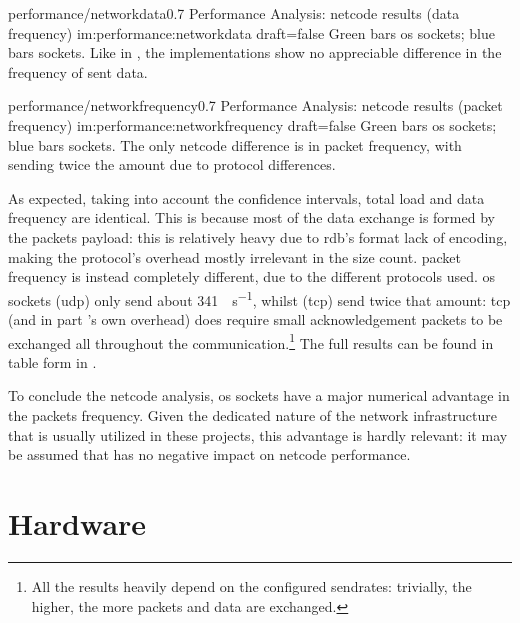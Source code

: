 \begin{image}
	{performance/networkdata}{0.7}
	{Performance Analysis: \gls{netcode} results (data frequency)}
	{im:performance:networkdata}
	{draft=false}
	{Green bars \gls{os} sockets; blue bars  sockets. Like in , the implementations show no appreciable difference in the frequency of sent data.}
\end{image}

\begin{image}
	{performance/networkfrequency}{0.7}
	{Performance Analysis: \gls{netcode} results (\gls{packet} frequency)}
	{im:performance:networkfrequency}
	{draft=false}
	{Green bars \gls{os} sockets; blue bars  sockets. The only \gls{netcode} difference is in \gls{packet} frequency, with  sending twice the amount due to protocol differences.}
\end{image}

As expected, taking into account the confidence intervals, total load and data frequency are identical. This is because most of the data exchange is formed by the \glspl{packet} \gls{payload}: this is relatively heavy due to \gls{rdb}'s format lack of encoding, making the protocol's overhead mostly irrelevant in the size count. \Gls{packet} frequency is instead completely different, due to the different protocols used. \gls{os} sockets (\gls{udp}) only send about \SI{341}{\packets\per\second}, whilst  (\gls{tcp}) send twice that amount: \gls{tcp} (and in part 's own overhead) does require small acknowledgement \glspl{packet} to be exchanged all throughout the communication.\footnote{All the results heavily depend on the configured \glspl{sendrate}: trivially, the higher, the more \glspl{packet} and data are exchanged.} The full results can be found in table form in .

To conclude the \gls{netcode} analysis, \gls{os} sockets have a major numerical advantage in the \glspl{packet} frequency. Given the dedicated nature of the network infrastructure that is usually utilized in these projects, this advantage is hardly relevant: it may be assumed that  has no negative impact on \gls{netcode} performance.

\section{Hardware}\label{sc:performance:hardware}

